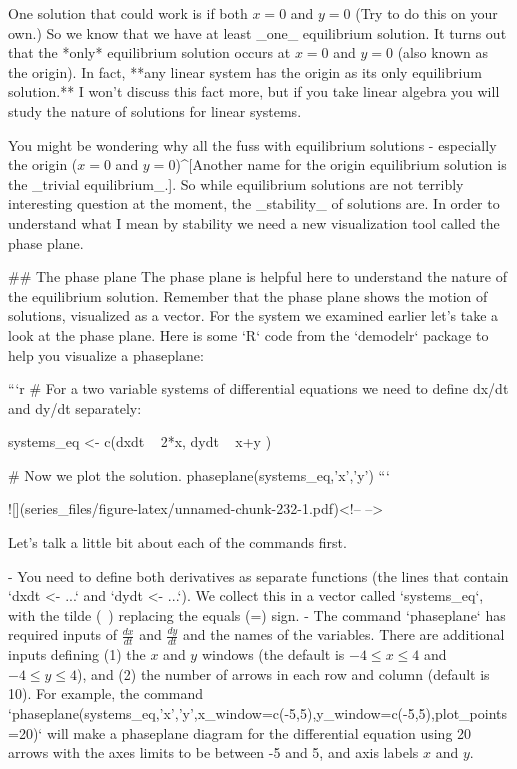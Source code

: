 \documentclass[
]{book}
\theoremstyle{definition}
\theoremstyle{definition}
\theoremstyle{definition}
\theoremstyle{remark}
\begin{document}
One solution that could work is if both $x=0$ and $y=0$ (Try to do this on your own.)  So we know that we have at least _one_ equilibrium solution.  It turns out that the *only* equilibrium solution occurs at $x=0$ and $y=0$ (also known as the origin).  In fact, **any linear system has the origin as its only equilibrium solution.**  I won't discuss this fact more, but if you take linear algebra you will study the nature of solutions for linear systems.

You might be wondering why all the fuss with equilibrium solutions - especially the origin ($x=0$ and $y=0$)^[Another name for the origin equilibrium solution is the _trivial equilibrium_.].  So while equilibrium solutions are not terribly interesting question at the moment, the _stability_ of solutions are.  In order to understand what I mean by stability we need a new visualization tool called the phase plane.

## The phase plane
The phase plane is helpful here to understand the nature of the equilibrium solution.  Remember that the phase plane shows the motion of solutions, visualized as a vector.  For the system we examined earlier let’s take a look at the phase plane.  Here is some `R` code from the `demodelr` package to help you visualize a phaseplane:


```r
# For a two variable systems of differential equations we need to define dx/dt and dy/dt separately:


systems_eq <- c(dxdt ~ 2*x,
                dydt ~ x+y )

# Now we plot the solution. 
phaseplane(systems_eq,'x','y')
```

![](series_files/figure-latex/unnamed-chunk-232-1.pdf)<!-- --> 

Let's talk a little bit about each of the commands first.

- You need to define both derivatives as separate functions (the lines that contain `dxdt <- ...` and `dydt <- ...`). We collect this in a vector called `systems_eq`, with the tilde (~) replacing the equals (=) sign.
- The command `phaseplane` has required inputs of $\displaystyle \frac{dx}{dt}$ and $\displaystyle \frac{dy}{dt}$ and the names of the variables.  There are additional inputs defining (1) the $x$ and $y$ windows (the default is $-4 \leq x \leq 4$ and $-4 \leq y \leq 4$), and (2) the number of arrows in each row and column (default is 10).  For example, the command `phaseplane(systems_eq,'x','y',x_window=c(-5,5),y_window=c(-5,5),plot_points=20)` will make a phaseplane diagram for the differential equation using 20 arrows with the axes limits to be between -5 and 5, and axis labels $x$ and $y$.
\end{document}
